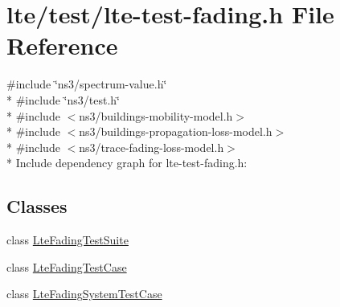 \hypertarget{lte-test-fading_8h}{}\section{lte/test/lte-\/test-\/fading.h File Reference}
\label{lte-test-fading_8h}
{\ttfamily \#include \char`\"{}ns3/spectrum-\/value.\+h\char`\"{}}\\*
{\ttfamily \#include \char`\"{}ns3/test.\+h\char`\"{}}\\*
{\ttfamily \#include $<$ns3/buildings-\/mobility-\/model.\+h$>$}\\*
{\ttfamily \#include $<$ns3/buildings-\/propagation-\/loss-\/model.\+h$>$}\\*
{\ttfamily \#include $<$ns3/trace-\/fading-\/loss-\/model.\+h$>$}\\*
Include dependency graph for lte-\/test-\/fading.h\+:
\subsection*{Classes}
\begin{DoxyCompactItemize}
\item 
class \hyperlink{classLteFadingTestSuite}{Lte\+Fading\+Test\+Suite}
\item 
class \hyperlink{classLteFadingTestCase}{Lte\+Fading\+Test\+Case}
\item 
class \hyperlink{classLteFadingSystemTestCase}{Lte\+Fading\+System\+Test\+Case}
\end{DoxyCompactItemize}
